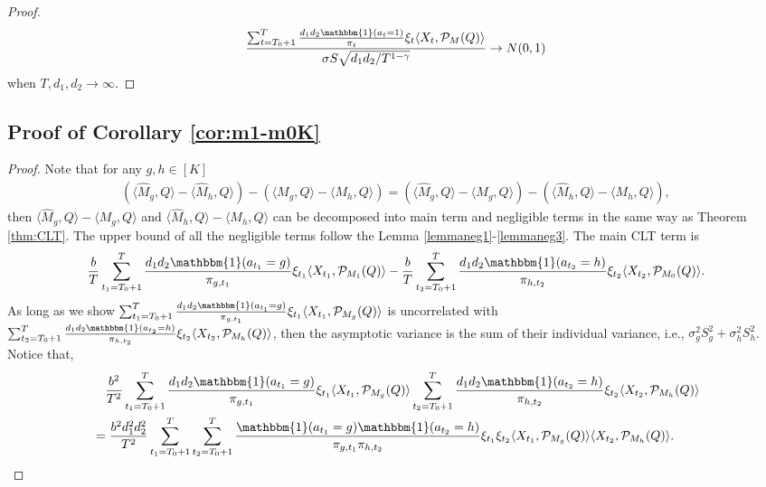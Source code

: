 \documentclass[12pt]{article}
\newcommand{\inp}[2]{\langle #1,#2\rangle}
\theoremstyle{plain}
\begin{document}
\begin{proof}
    \begin{align*}
        \frac{\sum_{t=T_0+1}^T \frac{d_1d_2\mathbbm{1}(a_t=1)}{\pi_t}\xi_t\inp{X_t}{\mathcal{P}_M(Q)}}{\sigma S\sqrt{d_1d_2/T^{1-\gamma}}} \rightarrow N(0,1)
    \end{align*}
    when $T, d_1, d_2\rightarrow \infty$.
\end{proof}

\subsection{Proof of Corollary \ref{cor:m1-m0K}}
\begin{proof}
    Note that for any $g,h\in [K]$
    \begin{align*}
        (\inp{\widehat{M}_g}{Q} - \inp{\widehat{M}_h}{Q}) - (\inp{M_g}{Q} - \inp{M_h}{Q})= (\inp{\widehat{M}_g}{Q} - \inp{M_g}{Q}) - (\inp{\widehat{M}_h}{Q} - \inp{M_h}{Q}),
    \end{align*}
    then $\inp{\widehat{M}_g}{Q} - \inp{M_g}{Q}$ and $\inp{\widehat{M}_h}{Q} - \inp{M_h}{Q}$ can be decomposed into main term and negligible terms in the same way as Theorem \ref{thm:CLT}. The upper bound of all the negligible terms follow the Lemma \ref{lemmaneg1}-\ref{lemmaneg3}. The main CLT term is
    \begin{align*}
        \frac{b}{T}\sum_{t_1=T_0+1}^{T}\frac{d_1d_2\mathbbm{1}(a_{t_1}=g)}{\pi_{g,t_1}}\xi_{t_1}\inp{X_{t_1}}{\mathcal{P}_{M_1}(Q)} - \frac{b}{T}\sum_{t_2=T_0+1}^{T}\frac{d_1d_2\mathbbm{1}(a_{t_2}=h)}{\pi_{h,t_2}}\xi_{t_2}\inp{X_{t_2}}{\mathcal{P}_{M_0}(Q)}.
    \end{align*}
    As long as we show $\sum_{t_1=T_0+1}^{T}\frac{d_1d_2\mathbbm{1}(a_{t_1}=g)}{\pi_{g,t_1}}\xi_{t_1}\inp{X_{t_1}}{\mathcal{P}_{M_g}(Q)}$ is uncorrelated with \\ $\sum_{t_2=T_0+1}^{T}\frac{d_1d_2\mathbbm{1}(a_{t_2}=h)}{\pi_{h,t_2}}\xi_{t_2}\inp{X_{t_2}}{\mathcal{P}_{M_h}(Q)}$, then the asymptotic variance is the sum of their individual variance, i.e., $\sigma_g^2S_g^2+\sigma_h^2S_h^2$. Notice that,
    \begin{align*}
        &\quad \frac{b^2}{T^2}\sum_{t_1=T_0+1}^{T}\frac{d_1d_2\mathbbm{1}(a_{t_1}=g)}{\pi_{g,t_1}}\xi_{t_1}\inp{X_{t_1}}{\mathcal{P}_{M_g}(Q)} \sum_{t_2=T_0+1}^{T}\frac{d_1d_2\mathbbm{1}(a_{t_2}=h)}{\pi_{h,t_2}}\xi_{t_2}\inp{X_{t_2}}{\mathcal{P}_{M_h}(Q)} \\
        &=\frac{b^2d_1^2d_2^2}{T^2}\sum_{t_1=T_0+1}^{T}\sum_{t_2=T_0+1}^{T} \frac{\mathbbm{1}(a_{t_1}=g)\mathbbm{1}(a_{t_2}=h)}{\pi_{g,t_1}\pi_{h,t_2}}\xi_{t_1}\xi_{t_2}\inp{X_{t_1}}{\mathcal{P}_{M_g}(Q)}\inp{X_{t_2}}{\mathcal{P}_{M_h}(Q)}.

\end{align*}
\end{proof}
\end{document}
